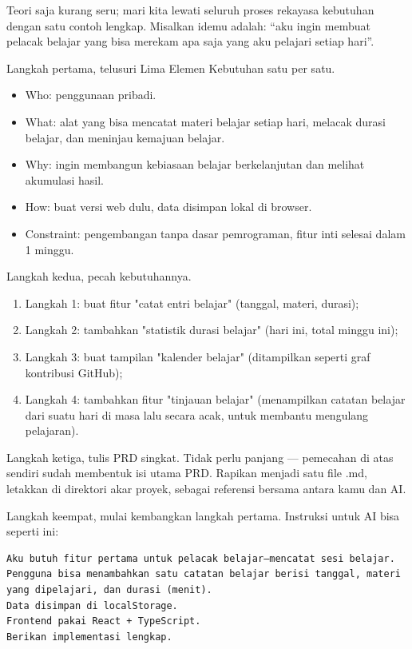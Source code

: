 Teori saja kurang seru; mari kita lewati seluruh proses rekayasa kebutuhan dengan satu contoh lengkap. Misalkan idemu adalah: “aku ingin membuat pelacak belajar yang bisa merekam apa saja yang aku pelajari setiap hari”.

Langkah pertama, telusuri Lima Elemen Kebutuhan satu per satu.

\begin{itemize}
  \item Who: penggunaan pribadi.
  \item What: alat yang bisa mencatat materi belajar setiap hari, melacak durasi belajar, dan meninjau kemajuan belajar.
  \item Why: ingin membangun kebiasaan belajar berkelanjutan dan melihat akumulasi hasil.
  \item How: buat versi web dulu, data disimpan lokal di browser.
  \item Constraint: pengembangan tanpa dasar pemrograman, fitur inti selesai dalam 1 minggu.
\end{itemize}

Langkah kedua, pecah kebutuhannya.

\begin{enumerate}
  \item Langkah 1: buat fitur "catat entri belajar" (tanggal, materi, durasi);
  \item Langkah 2: tambahkan "statistik durasi belajar" (hari ini, total minggu ini);
  \item Langkah 3: buat tampilan "kalender belajar" (ditampilkan seperti graf kontribusi GitHub);
  \item Langkah 4: tambahkan fitur "tinjauan belajar" (menampilkan catatan belajar dari suatu hari di masa lalu secara acak, untuk membantu mengulang pelajaran).
\end{enumerate}

Langkah ketiga, tulis PRD singkat. Tidak perlu panjang — pemecahan di atas sendiri sudah membentuk isi utama PRD. Rapikan menjadi satu file .md, letakkan di direktori akar proyek, sebagai referensi bersama antara kamu dan AI.

Langkah keempat, mulai kembangkan langkah pertama. Instruksi untuk AI bisa seperti ini:

\begin{lstlisting}
Aku butuh fitur pertama untuk pelacak belajar—mencatat sesi belajar.
Pengguna bisa menambahkan satu catatan belajar berisi tanggal, materi yang dipelajari, dan durasi (menit).
Data disimpan di localStorage.
Frontend pakai React + TypeScript.
Berikan implementasi lengkap.
\end{lstlisting}

